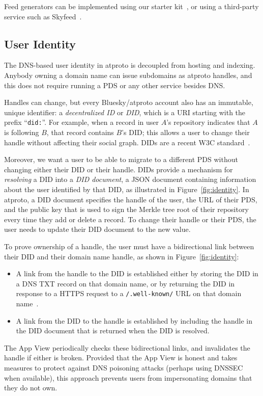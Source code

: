 \documentclass[sigconf]{acmart}
\begin{document}
Feed generators can be implemented using our starter kit~\cite{FeedGeneratorKit}, or using a third-party service such as Skyfeed~\cite{Skyfeed}.

\subsection{User Identity}\label{sec:identity}

The DNS-based user identity in atproto is decoupled from hosting and indexing.
Anybody owning a domain name can issue subdomains as atproto handles, and this does not require running a PDS or any other service besides DNS.

Handles can change, but every Bluesky/atproto account also has an immutable, unique identifier: a \emph{decentralized ID} or \emph{DID}, which is a URI starting with the prefix ``\texttt{did:}''.
For example, when a record in user $A$'s repository indicates that $A$ is following $B$, that record contains $B$'s DID; this allows a user to change their handle without affecting their social graph.
DIDs are a recent W3C standard~\cite{DIDCore}.

Moreover, we want a user to be able to migrate to a different PDS without changing either their DID or their handle.
DIDs provide a mechanism for \emph{resolving} a DID into a \emph{DID document}, a JSON document containing information about the user identified by that DID, as illustrated in Figure~\ref{fig:identity}.
In atproto, a DID document specifies the handle of the user, the URL of their PDS, and the public key that is used to sign the Merkle tree root of their repository every time they add or delete a record.
To change their handle or their PDS, the user needs to update their DID document to the new value.

To prove ownership of a handle, the user must have a bidirectional link between their DID and their domain name handle, as shown in Figure~\ref{fig:identity}:
\begin{itemize}
    \item A link from the handle to the DID is established either by storing the DID in a DNS TXT record on that domain name, or by returning the DID in response to a HTTPS request to a \texttt{/.well-known/} URL on that domain name~\cite{DomainHandle}.
    \item A link from the DID to the handle is established by including the handle in the DID document that is returned when the DID is resolved.
\end{itemize}
The App View periodically checks these bidirectional links, and invalidates the handle if either is broken.
Provided that the App View is honest and takes measures to protect against DNS poisoning attacks (perhaps using DNSSEC when available), this approach prevents users from impersonating domains that they do not own.
\end{document}
